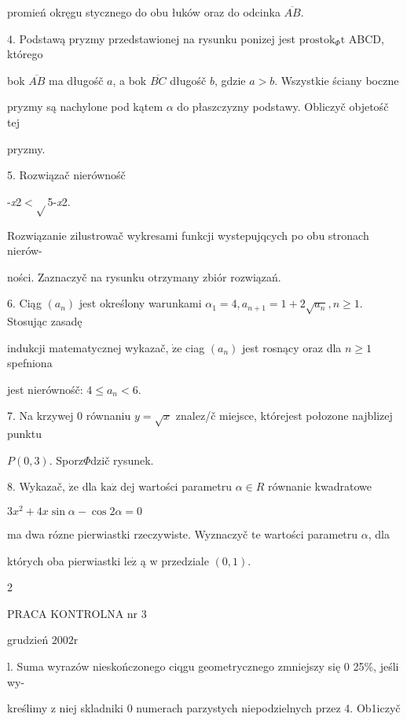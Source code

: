 \documentclass[a4paper,12pt]{article}
\begin{document}
promień okręgu stycznego do obu łuków oraz do odcinka $\overline{AB}.$

4. Podstawą pryzmy przedstawionej na rysunku ponizej jest $\mathrm{p}\mathrm{r}\mathrm{o}\mathrm{s}\mathrm{t}\mathrm{o}\mathrm{k}_{\Phi}\mathrm{t}$ ABCD, którego

bok $\overline{AB}$ ma długośč $a$, a bok $\overline{BC}$ długośč $b$, gdzie $a>b$. Wszystkie ściany boczne

pryzmy są nachylone pod kątem $\alpha$ do płaszczyzny podstawy. Obliczyč objetośč tej

pryzmy.

5. Rozwiązač nierównośč

-{\it x}2$<\sqrt{}$5-{\it x}2.

Rozwiązanie zilustrowač wykresami funkcji wystepujqcych po obu stronach nierów-

ności. Zaznaczyč na rysunku otrzymany zbiór rozwiązań.

6. Ciąg $(a_{n})$ jest określony warunkami $\alpha_{1}=4, a_{n+1}=1+2\sqrt{a_{n}}, n\geq 1$. Stosując zasadę

indukcji matematycznej wykazač, $\dot{\mathrm{z}}\mathrm{e}$ ciag $(a_{n})$ jest rosnący oraz dla $n\geq 1$ spefniona

jest nierównośč: $4\leq a_{n}<6.$

7. Na krzywej $0$ równaniu $y=\sqrt{x}$ znalez/č miejsce, którejest połozone najblizej punktu

$P(0,3)$. Sporz$\Phi$dzič rysunek.

8. Wykazač, $\dot{\mathrm{z}}\mathrm{e}$ dla $\mathrm{k}\mathrm{a}\dot{\mathrm{z}}$ dej wartości parametru $\alpha\in R$ równanie kwadratowe

$3x^{2}+4x\sin\alpha-\cos 2\alpha=0$

ma dwa rózne pierwiastki rzeczywiste. Wyznaczyč te wartości parametru $\alpha$, dla

których oba pierwiastki $\mathrm{l}\mathrm{e}\dot{\mathrm{z}}$ ą $\mathrm{w}$ przedziale $(0,1).$

2





PRACA KONTROLNA nr 3

grudzień $2002\mathrm{r}$

l. Suma wyrazów nieskończonego ciqgu geometrycznego zmniejszy się $0$ 25\%, jeśli wy-

kreślimy $\mathrm{z}$ niej skladniki $0$ numerach parzystych niepodzielnych przez 4. Ob1iczyč
\end{document}
